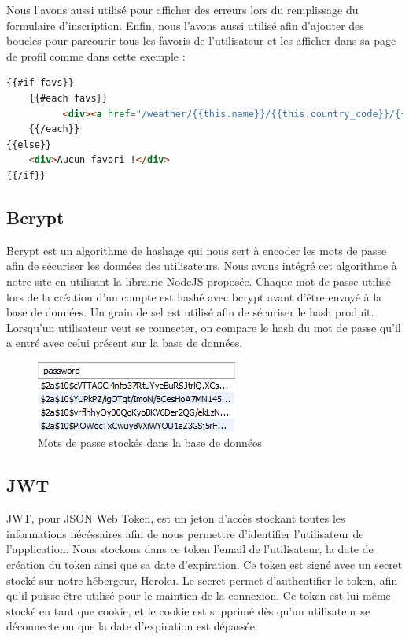 \documentclass[12pt, french]{article}
\begin{document}
        {\parindent0pt
            Nous l'avons aussi utilisé pour afficher des erreurs lors du remplissage du formulaire d'inscription. Enfin, nous l'avons aussi utilisé afin d'ajouter des boucles pour parcourir tous les favoris de l'utilisateur et les afficher dans sa page de profil comme dans cette exemple :
    		
		    \begin{lstlisting}[language=html]
{{#if favs}}
    {{#each favs}}
          <div><a href="/weather/{{this.name}}/{{this.country_code}}/{{this.lat}}/{{this.lon}}">{{this.name}}, {{this.country_code}}, ({{this.lat}}, {{this.lon}})</a></div>
    {{/each}}
{{else}}
    <div>Aucun favori !</div>
{{/if}}
		    \end{lstlisting}
        }
		\newpage
		\subsection{Bcrypt}
		Bcrypt\cite{Bcrypt} est un algorithme de hashage qui nous sert à encoder les mots de passe afin de sécuriser les données des utilisateurs. Nous avons intégré cet algorithme à notre site en utilisant la librairie NodeJS proposée. Chaque mot de passe utilisé lors de la création d'un compte est hashé avec bcrypt avant d'être envoyé à la base de données. Un grain de sel est utilisé afin de sécuriser le hash produit. Lorsqu'un utilisateur veut se connecter, on compare le hash du mot de passe qu'il a entré avec celui présent sur la base de données.
		\begin{center}
		\begin{figure}[!h]
		    \centering
		    \includegraphics[width=.51\linewidth]{images/mdp.png}
		    \caption{Mots de passe stockés dans la base de données}
		    \label{fig:mdp}
		\end{figure}
		    
		\end{center}
		
		\subsection{JWT}
		    JWT\cite{JWT}, pour JSON Web Token, est un jeton d'accès stockant toutes les informations nécéssaires afin de nous permettre d'identifier l'utilisateur de l'application. 
		    Nous stockons dans ce token l'email de l'utilisateur, la date de création du token ainsi que sa date d'expiration. Ce token est signé avec un secret stocké sur notre hébergeur, Heroku. Le secret permet d'authentifier le token, afin qu'il puisse être utilisé pour le maintien de la connexion. Ce token est lui-même stocké en tant que cookie, et le cookie est supprimé dès qu'un utilisateur se déconnecte ou que la date d'expiration est dépassée.
\end{document}
